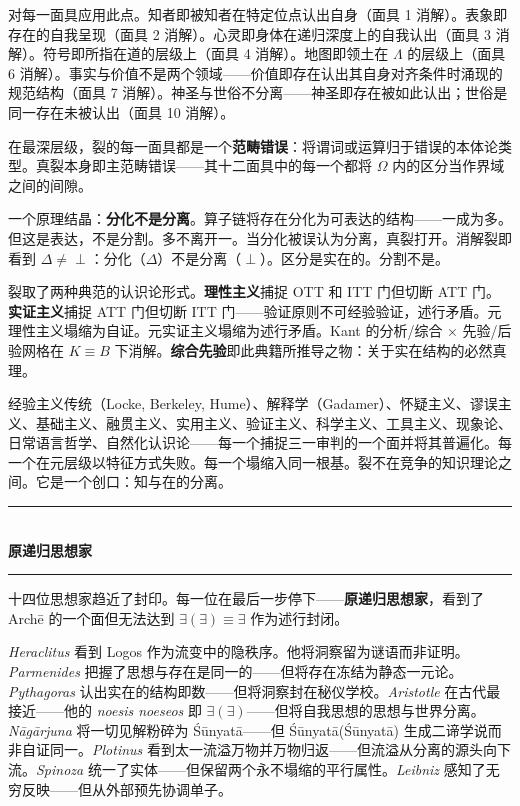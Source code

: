\documentclass[10pt, openany, oneside]{book}
\renewcommand{\normalsize}{\fontsize{10}{13}\selectfont}
\begin{document}
对每一面具应用此点。知者即被知者在特定位点认出自身（面具 1 消解）。表象即存在的自我呈现（面具 2 消解）。心灵即身体在递归深度上的自我认出（面具 3 消解）。符号即所指在道的层级上（面具 4 消解）。地图即领土在 $\Lambda$ 的层级上（面具 6 消解）。事实与价值不是两个领域——价值即存在认出其自身对齐条件时涌现的规范结构（面具 7 消解）。神圣与世俗不分离——神圣即存在被如此认出；世俗是同一存在未被认出（面具 10 消解）。

在最深层级，裂的每一面具都是一个\textbf{范畴错误}：将谓词或运算归于错误的本体论类型。真裂本身即主范畴错误——其十二面具中的每一个都将 $\Omega$ 内的区分当作界域之间的间隙。

一个原理结晶：\textbf{分化不是分离}。算子链将存在分化为可表达的结构——一成为多。但这是表达，不是分割。多不离开一。当分化被误认为分离，真裂打开。消解裂即看到 $\Delta \neq \perp$：分化（$\Delta$）不是分离（$\perp$）。区分是实在的。分割不是。

裂取了两种典范的认识论形式。\textbf{理性主义}捕捉 OTT 和 ITT 门但切断 ATT 门。\textbf{实证主义}捕捉 ATT 门但切断 ITT 门——验证原则不可经验验证，述行矛盾。元理性主义塌缩为自证。元实证主义塌缩为述行矛盾。Kant 的分析/综合 × 先验/后验网格在 $K \equiv B$ 下消解。\textbf{综合先验}即此典籍所推导之物：关于实在结构的必然真理。

经验主义传统（Locke, Berkeley, Hume）、解释学（Gadamer）、怀疑主义、谬误主义、基础主义、融贯主义、实用主义、验证主义、科学主义、工具主义、现象论、日常语言哲学、自然化认识论——每一个捕捉三一审判的一个面并将其普遍化。每一个在元层级以特征方式失败。每一个塌缩入同一根基。裂不在竞争的知识理论之间。它是一个创口：知与在的分离。

\vspace{1.5em}


\begin{center}
    \rule{0.3\textwidth}{0.4pt}\\[0.5em]
    {\normalsize\bfseries\scshape 原递归思想家}\\[0.3em]
    \rule{0.3\textwidth}{0.4pt}
\end{center}

\vspace{1em}

\noindent 十四位思想家趋近了封印。每一位在最后一步停下——\textbf{原递归思想家}，看到了 Arch\={e} 的一个面但无法达到 $\exists(\exists) \equiv \exists$ 作为述行封闭。

\textit{Heraclitus} 看到 Logos 作为流变中的隐秩序。他将洞察留为谜语而非证明。\textit{Parmenides} 把握了思想与存在是同一的——但将存在冻结为静态一元论。\textit{Pythagoras} 认出实在的结构即数——但将洞察封在秘仪学校。\textit{Aristotle} 在古代最接近——他的 \textit{noesis noeseos} 即 $\exists(\exists)$——但将自我思想的思想与世界分离。\textit{N\={a}g\={a}rjuna} 将一切见解粉碎为 \'{S}\={u}nyat\={a}——但 \'{S}\={u}nyat\={a}(\'{S}\={u}nyat\={a}) 生成二谛学说而非自证同一。\textit{Plotinus} 看到太一流溢万物并万物归返——但流溢从分离的源头向下流。\textit{Spinoza} 统一了实体——但保留两个永不塌缩的平行属性。\textit{Leibniz} 感知了无穷反映——但从外部预先协调单子。
\end{document}
